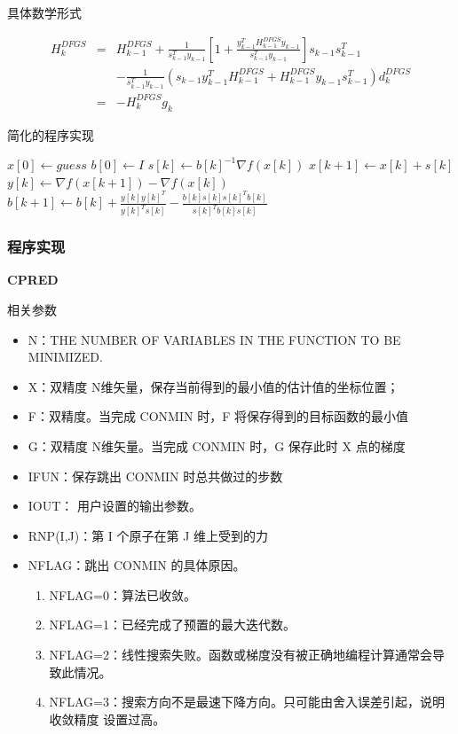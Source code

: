 \documentclass{ctexart}
\begin{document}
具体数学形式


\begin{eqnarray}
    H_{k}^{DFGS} &=& H_{k-1}^{DFGS} + \frac{1}{s_{k-1}^{T}y_{k-1}}[1+\frac{y_{k-1}^{T}H_{k-1}^{DFGS}y_{k-1}}{s_{k-1}^{T}y_{k-1}}]s_{k-1}s_{k-1}^{T}\nonumber\\
    &&-\frac{1}{s_{k-1}^{T}y_{k-1}}(s_{k-1}y_{k-1}^{T}H_{k-1}^{DFGS}+H_{k-1}^{DFGS}y_{k-1}s_{k-1}^{T})d_{k}^{DFGS}\nonumber\\
    &=& -H_{k}^{DFGS}g_{k}
\end{eqnarray}

简化的程序实现

\begin{algorithm}
    \begin{algorithmic}
        \STATE $x[0] \leftarrow guess$
        \STATE $b[0] \leftarrow I$
        \STATE $s[k] \leftarrow b[k]^{-1} \nabla f(x[k])$
        \STATE $x[k+1] \leftarrow x[k] + s[k]$
        \STATE $y[k] \leftarrow \nabla f(x[k+1]) - \nabla f(x[k])$
        \STATE $b[k+1] \leftarrow b[k] + \frac{y[k]y[k]^{T}}{y[k]^{T}s[k]} - \frac{b[k]s[k]s[k]^{T}b[k]}{s[k]^{T}b[k]s[k]}$
        \ENDFOR
    \end{algorithmic}
\end{algorithm}

\subsubsection{程序实现}
\noindent
\textbf{CPRED}

\noindent
相关参数
\begin{itemize}
    \item N：THE NUMBER OF VARIABLES IN THE FUNCTION TO BE MINIMIZED.
    \item X：双精度 N维矢量，保存当前得到的最小值的估计值的坐标位置；
    \item F：双精度。当完成 CONMIN 时，F 将保存得到的目标函数的最小值
    \item G：双精度 N维矢量。当完成 CONMIN 时，G 保存此时 X 点的梯度
    \item IFUN：保存跳出 CONMIN 时总共做过的步数
    \item IOUT： 用户设置的输出参数。
    \item RNP(I,J)：第 I 个原子在第 J 维上受到的力
    \item NFLAG：跳出 CONMIN 的具体原因。
          \begin{enumerate}
              \item NFLAG=0：算法已收敛。
              \item NFLAG=1：已经完成了预置的最大迭代数。
              \item NFLAG=2：线性搜索失败。函数或梯度没有被正确地编程计算通常会导致此情况。
              \item NFLAG=3：搜索方向不是最速下降方向。只可能由舍入误差引起，说明收敛精度 设置过高。
          \end{enumerate}
\end{itemize}
\end{document}

